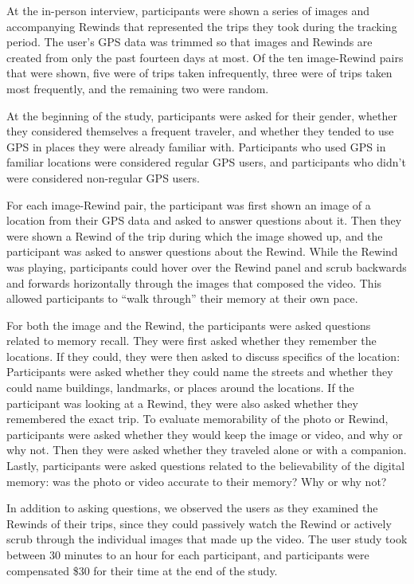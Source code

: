 \documentclass{sigchi}
\begin{document}
At the in-person interview, participants were shown a series of images and accompanying Rewinds that represented the trips they took during the tracking period. The user's GPS data was trimmed so that images and Rewinds are created from only the past fourteen days at most. Of the ten image-Rewind pairs that were shown, five were of trips taken infrequently, three were of trips taken most frequently, and the remaining two were random. 

At the beginning of the study, participants were asked for their gender, whether they considered themselves a frequent traveler, and whether they tended to use GPS in places they were already familiar with. Participants who used GPS in familiar locations were considered regular GPS users, and participants who didn't were considered non-regular GPS users.

For each image-Rewind pair, the participant was first shown an image of a location from their GPS data and asked to answer questions about it. Then they were shown a Rewind of the trip during which the image showed up, and the participant was asked to answer questions about the Rewind. While the Rewind was playing, participants could hover over the Rewind panel and scrub backwards and forwards horizontally through the images that composed the video. This allowed participants to ``walk through'' their memory at their own pace.

For both the image and the Rewind, the participants were asked questions related to memory recall. They were first asked whether they remember the locations. If they could, they were then asked to discuss specifics of the location: Participants were asked whether they could name the streets and whether they could name buildings, landmarks, or places around the locations. If the participant was looking at a Rewind, they were also asked whether they remembered the exact trip. To evaluate memorability of the photo or Rewind, participants were asked whether they would keep the image or video, and why or why not. Then they were asked whether they traveled alone or with a companion. Lastly, participants were asked questions related to the believability of the digital memory: was the photo or video accurate to their memory? Why or why not?

In addition to asking questions, we observed the users as they examined the Rewinds of their trips, since they could passively watch the Rewind or actively scrub through the individual images that made up the video. The user study took between 30 minutes to an hour for each participant, and participants were compensated \$30 for their time at the end of the study.
\end{document}
